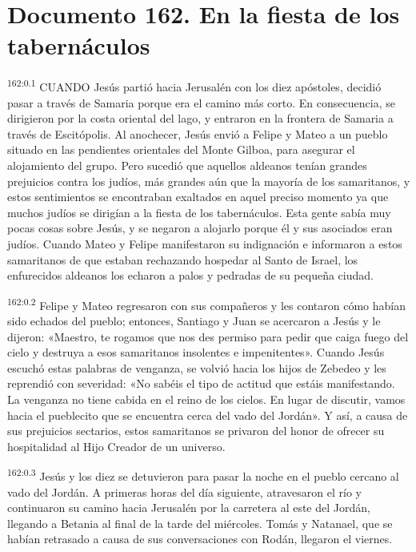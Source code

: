 \chapter{Documento 162. En la fiesta de los tabernáculos}
\par 
\textsuperscript{162:0.1} CUANDO Jesús partió hacia Jerusalén con los diez apóstoles, decidió pasar a través de Samaria porque era el camino más corto. En consecuencia, se dirigieron por la costa oriental del lago, y entraron en la frontera de Samaria a través de Escitópolis. Al anochecer, Jesús envió a Felipe y Mateo a un pueblo situado en las pendientes orientales del Monte Gilboa, para asegurar el alojamiento del grupo. Pero sucedió que aquellos aldeanos tenían grandes prejuicios contra los judíos, más grandes aún que la mayoría de los samaritanos, y estos sentimientos se encontraban exaltados en aquel preciso momento ya que muchos judíos se dirigían a la fiesta de los tabernáculos. Esta gente sabía muy pocas cosas sobre Jesús, y se negaron a alojarlo porque él y sus asociados eran judíos. Cuando Mateo y Felipe manifestaron su indignación e informaron a estos samaritanos de que estaban rechazando hospedar al Santo de Israel, los enfurecidos aldeanos los echaron a palos y pedradas de su pequeña ciudad.

\par 
\textsuperscript{162:0.2} Felipe y Mateo regresaron con sus compañeros y les contaron cómo habían sido echados del pueblo; entonces, Santiago y Juan se acercaron a Jesús y le dijeron: «Maestro, te rogamos que nos des permiso para pedir que caiga fuego del cielo y destruya a esos samaritanos insolentes e impenitentes». Cuando Jesús escuchó estas palabras de venganza, se volvió hacia los hijos de Zebedeo y les reprendió con severidad: «No sabéis el tipo de actitud que estáis manifestando. La venganza no tiene cabida en el reino de los cielos. En lugar de discutir, vamos hacia el pueblecito que se encuentra cerca del vado del Jordán». Y así, a causa de sus prejuicios sectarios, estos samaritanos se privaron del honor de ofrecer su hospitalidad al Hijo Creador de un universo.

\par 
\textsuperscript{162:0.3} Jesús y los diez se detuvieron para pasar la noche en el pueblo cercano al vado del Jordán. A primeras horas del día siguiente, atravesaron el río y continuaron su camino hacia Jerusalén por la carretera al este del Jordán, llegando a Betania al final de la tarde del miércoles. Tomás y Natanael, que se habían retrasado a causa de sus conversaciones con Rodán, llegaron el viernes.

